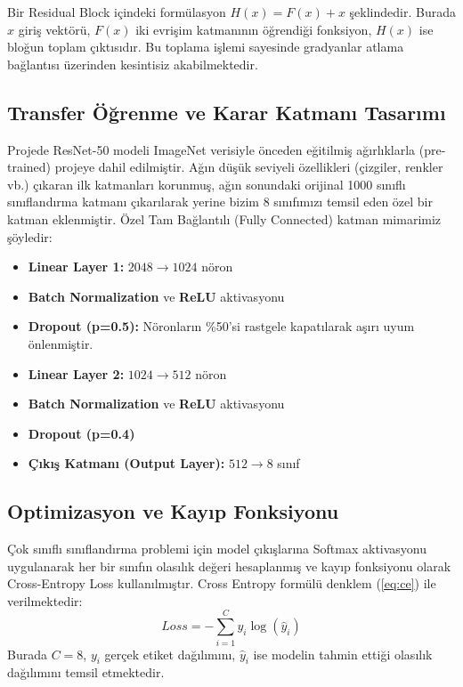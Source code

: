 \documentclass[conference]{IEEEtran}
\begin{document}
Bir Residual Block içindeki formülasyon $H(x) = F(x) + x$ şeklindedir. Burada $x$ giriş vektörü, $F(x)$ iki evrişim katmanının öğrendiği fonksiyon, $H(x)$ ise bloğun toplam çıktısıdır. Bu toplama işlemi sayesinde gradyanlar atlama bağlantısı üzerinden kesintisiz akabilmektedir.

\subsection{Transfer Öğrenme ve Karar Katmanı Tasarımı}
Projede ResNet-50 modeli ImageNet verisiyle önceden eğitilmiş ağırlıklarla (pre-trained) projeye dahil edilmiştir. Ağın düşük seviyeli özellikleri (çizgiler, renkler vb.) çıkaran ilk katmanları korunmuş, ağın sonundaki orijinal 1000 sınıflı sınıflandırma katmanı çıkarılarak yerine bizim 8 sınıfımızı temsil eden özel bir katman eklenmiştir.
Özel Tam Bağlantılı (Fully Connected) katman mimarimiz şöyledir:
\begin{itemize}
    \item \textbf{Linear Layer 1:} $2048 \rightarrow 1024$ nöron
    \item \textbf{Batch Normalization} ve \textbf{ReLU} aktivasyonu
    \item \textbf{Dropout (p=0.5):} Nöronların \%50'si rastgele kapatılarak aşırı uyum önlenmiştir.
    \item \textbf{Linear Layer 2:} $1024 \rightarrow 512$ nöron
    \item \textbf{Batch Normalization} ve \textbf{ReLU} aktivasyonu
    \item \textbf{Dropout (p=0.4)}
    \item \textbf{Çıkış Katmanı (Output Layer):} $512 \rightarrow 8$ sınıf
\end{itemize}

\subsection{Optimizasyon ve Kayıp Fonksiyonu}
Çok sınıflı sınıflandırma problemi için model çıkışlarına Softmax aktivasyonu uygulanarak her bir sınıfın olasılık değeri hesaplanmış ve kayıp fonksiyonu olarak Cross-Entropy Loss kullanılmıştır. Cross Entropy formülü denklem (\ref{eq:ce}) ile verilmektedir:
\begin{equation}
    Loss = - \sum_{i=1}^{C} y_i \log(\hat{y}_i) \label{eq:ce}
\end{equation}
Burada $C=8$, $y_i$ gerçek etiket dağılımını, $\hat{y}_i$ ise modelin tahmin ettiği olasılık dağılımını temsil etmektedir.
\end{document}
